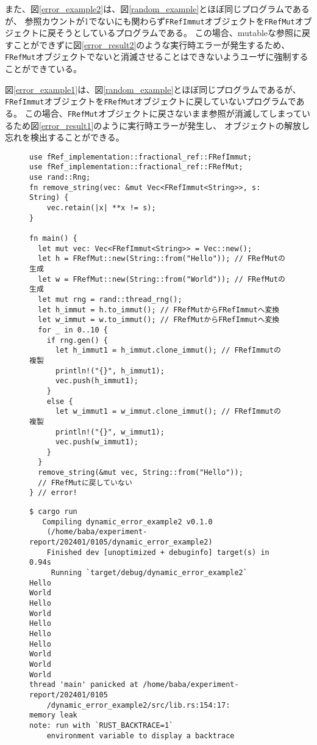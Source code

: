 \documentclass{sumiilab-paper}
\theoremstyle{mystyle}
\numberwithin{definition}{chapter} %
\begin{document}
また、図\ref{error_example2}は、図\ref{random_example}とほぼ同じプログラムであるが、
参照カウントが1でないにも関わらず\texttt{FRefImmut}オブジェクトを\texttt{FRefMut}オブジェクトに戻そうとしているプログラムである。
この場合、mutableな参照に戻すことができずに図\ref{error_result2}のような実行時エラーが発生するため、
\texttt{FRefMut}オブジェクトでないと消滅させることはできないようユーザに強制することができている。

図\ref{error_example1}は、図\ref{random_example}とほぼ同じプログラムであるが、
\texttt{FRefImmut}オブジェクトを\texttt{FRefMut}オブジェクトに戻していないプログラムである。
この場合、\texttt{FRefMut}オブジェクトに戻さないまま参照が消滅してしまっているため図\ref{error_result1}のように実行時エラーが発生し、
オブジェクトの解放し忘れを検出することができる。

\begin{figure}[htp]
\begin{lstlisting}[caption=オブジェクトの解放し忘れを検出する例, 
  label=error_example1, captionpos=b]
use fRef_implementation::fractional_ref::FRefImmut;
use fRef_implementation::fractional_ref::FRefMut;
use rand::Rng;
fn remove_string(vec: &mut Vec<FRefImmut<String>>, s: String) {
    vec.retain(|x| **x != s);
}

fn main() {
  let mut vec: Vec<FRefImmut<String>> = Vec::new();
  let h = FRefMut::new(String::from("Hello")); // FRefMutの生成
  let w = FRefMut::new(String::from("World")); // FRefMutの生成
  let mut rng = rand::thread_rng();
  let h_immut = h.to_immut(); // FRefMutからFRefImmutへ変換
  let w_immut = w.to_immut(); // FRefMutからFRefImmutへ変換
  for _ in 0..10 {
    if rng.gen() {
      let h_immut1 = h_immut.clone_immut(); // FRefImmutの複製
      println!("{}", h_immut1);
      vec.push(h_immut1);
    }
    else {
      let w_immut1 = w_immut.clone_immut(); // FRefImmutの複製
      println!("{}", w_immut1);
      vec.push(w_immut1);
    }
  }
  remove_string(&mut vec, String::from("Hello"));
  // FRefMutに戻していない
} // error!
\end{lstlisting}
\end{figure}

\begin{figure}[p]
\begin{lstlisting}[caption=オブジェクトの解放し忘れのエラー, 
  label=error_result1, captionpos=b]
$ cargo run
   Compiling dynamic_error_example2 v0.1.0 
    (/home/baba/experiment-report/202401/0105/dynamic_error_example2)
    Finished dev [unoptimized + debuginfo] target(s) in 0.94s
     Running `target/debug/dynamic_error_example2`
Hello
World
Hello
World
Hello
Hello
Hello
World
World
World
thread 'main' panicked at /home/baba/experiment-report/202401/0105
    /dynamic_error_example2/src/lib.rs:154:17:
memory leak
note: run with `RUST_BACKTRACE=1` 
    environment variable to display a backtrace
\end{lstlisting}
\end{figure}
\end{document}
